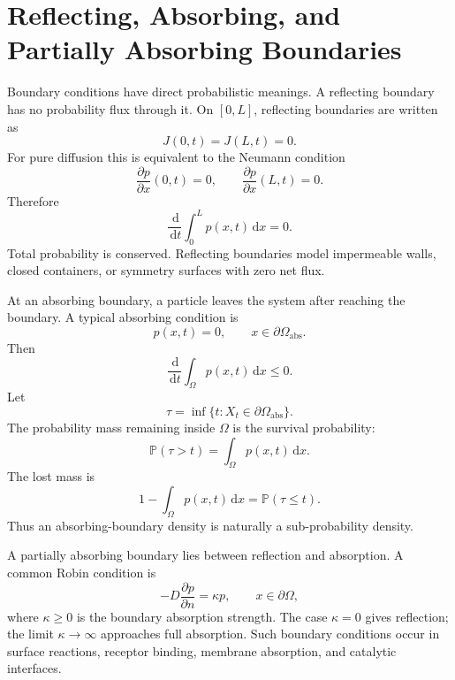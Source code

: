 \documentclass[11pt,a4paper]{article}
\numberwithin{equation}{section}
\newcommand{\Prob}{\mathbb{P}}
\newcommand{\dd}{\,\mathrm{d}}
\begin{document}
\section{Reflecting, Absorbing, and Partially Absorbing Boundaries}

Boundary conditions have direct probabilistic meanings. A reflecting boundary has no probability flux through it. On \([0,L]\), reflecting boundaries are written as
\begin{equation}
  J(0,t)=J(L,t)=0.
  \label{eq:reflecting-flux}
\end{equation}
For pure diffusion this is equivalent to the Neumann condition
\begin{equation}
  \frac{\partial p}{\partial x}(0,t)=0,
  \qquad
  \frac{\partial p}{\partial x}(L,t)=0.
  \label{eq:reflecting-neumann}
\end{equation}
Therefore
\begin{equation}
  \frac{\dd}{\dd t}\int_0^L p(x,t)\dd x=0.
  \label{eq:reflecting-mass}
\end{equation}
Total probability is conserved. Reflecting boundaries model impermeable walls, closed containers, or symmetry surfaces with zero net flux.

At an absorbing boundary, a particle leaves the system after reaching the boundary. A typical absorbing condition is
\begin{equation}
  p(x,t)=0,
  \qquad x\in\partial\Omega_{\mathrm{abs}}.
  \label{eq:absorbing-boundary}
\end{equation}
Then
\begin{equation}
  \frac{\dd}{\dd t}\int_{\Omega}p(x,t)\dd x\le 0.
  \label{eq:absorbing-mass-decay}
\end{equation}
Let
\begin{equation}
  \tau=\inf\{t:X_t\in\partial\Omega_{\mathrm{abs}}\}.
  \label{eq:hitting-time}
\end{equation}
The probability mass remaining inside \(\Omega\) is the survival probability:
\begin{equation}
  \Prob(\tau>t)=\int_{\Omega}p(x,t)\dd x.
  \label{eq:survival-probability}
\end{equation}
The lost mass is
\begin{equation}
  1-\int_{\Omega}p(x,t)\dd x=\Prob(\tau\le t).
  \label{eq:absorbed-probability}
\end{equation}
Thus an absorbing-boundary density is naturally a sub-probability density.

A partially absorbing boundary lies between reflection and absorption. A common Robin condition is
\begin{equation}
  -D\frac{\partial p}{\partial n}
  =\kappa p,
  \qquad x\in\partial\Omega,
  \label{eq:robin-boundary}
\end{equation}
where \(\kappa\ge0\) is the boundary absorption strength. The case \(\kappa=0\) gives reflection; the limit \(\kappa\to\infty\) approaches full absorption. Such boundary conditions occur in surface reactions, receptor binding, membrane absorption, and catalytic interfaces.
\end{document}
